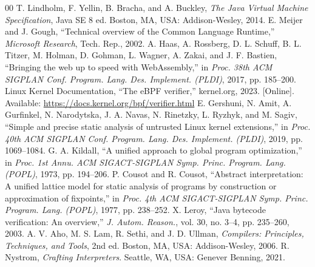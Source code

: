 \documentclass[conference]{IEEEtran}
\begin{document}
\begin{thebibliography}{00}
 T. Lindholm, F. Yellin, B. Bracha, and A. Buckley, \textit{The Java Virtual Machine Specification}, Java SE 8 ed. Boston, MA, USA: Addison-Wesley, 2014.
 E. Meijer and J. Gough, ``Technical overview of the Common Language Runtime,'' \textit{Microsoft Research}, Tech. Rep., 2002.
 A. Haas, A. Rossberg, D. L. Schuff, B. L. Titzer, M. Holman, D. Gohman, L. Wagner, A. Zakai, and J. F. Bastien, ``Bringing the web up to speed with WebAssembly,'' in \textit{Proc. 38th ACM SIGPLAN Conf. Program. Lang. Des. Implement. (PLDI)}, 2017, pp. 185--200.
 Linux Kernel Documentation, ``The eBPF verifier,'' kernel.org, 2023. [Online]. Available: \url{https://docs.kernel.org/bpf/verifier.html}
 E. Gershuni, N. Amit, A. Gurfinkel, N. Narodytska, J. A. Navas, N. Rinetzky, L. Ryzhyk, and M. Sagiv, ``Simple and precise static analysis of untrusted Linux kernel extensions,'' in \textit{Proc. 40th ACM SIGPLAN Conf. Program. Lang. Des. Implement. (PLDI)}, 2019, pp. 1069--1084.
 G. A. Kildall, ``A unified approach to global program optimization,'' in \textit{Proc. 1st Annu. ACM SIGACT-SIGPLAN Symp. Princ. Program. Lang. (POPL)}, 1973, pp. 194--206.
 P. Cousot and R. Cousot, ``Abstract interpretation: A unified lattice model for static analysis of programs by construction or approximation of fixpoints,'' in \textit{Proc. 4th ACM SIGACT-SIGPLAN Symp. Princ. Program. Lang. (POPL)}, 1977, pp. 238--252.
 X. Leroy, ``Java bytecode verification: An overview,'' \textit{J. Autom. Reason.}, vol. 30, no. 3--4, pp. 235--260, 2003.
 A. V. Aho, M. S. Lam, R. Sethi, and J. D. Ullman, \textit{Compilers: Principles, Techniques, and Tools}, 2nd ed. Boston, MA, USA: Addison-Wesley, 2006.
 R. Nystrom, \textit{Crafting Interpreters}. Seattle, WA, USA: Genever Benning, 2021.
\end{thebibliography}
\end{document}
